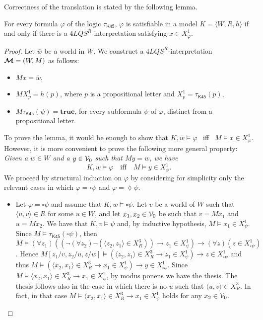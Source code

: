 \documentclass{fundam}
\newcommand{\true}{\mathbf{true}}
\newcommand{\model}{\ensuremath{\mbox{\boldmath $\mathcal{M}$}}\xspace}
\newcommand{\Kr}{\mathit{K}}
\newcommand{\Kqc}{\mathsf{K45}}
\newcommand{\TKqc}{\tau_{\Kqc}}
\newcommand{\QLQSR}{\ensuremath{\mbox{$4\mathit{LQS}^{R}$}}\xspace}
\begin{document}
Correctness of the translation is stated by the following lemma.
\begin{lemma}\label{leK45}
For every formula $\varphi$ of the logic $\TKqc$, $\varphi$ is
satisfiable in a model $\Kr = \langle W,R,h\rangle$ if and only if
there is a
$\QLQSR$-interpretation satisfying $x \in X_{\varphi}^1$.\end{lemma}
\begin{proof}
Let $\bar{w}$ be a world in $W$.  We construct a
$\QLQSR$-interpretation $\model=(W,M)$ as follows:
\begin{itemize}
\item $Mx = \bar{w}$,

\item $M X_{p}^{1} = h(p)$, where $p$ is a propositional letter and
$X_{p}^{1} = \TKqc(p)$,

\item $M\TKqc(\psi) = \true$, for every subformula $\psi$ of
$\varphi$,
distinct from a propositional letter.
\end{itemize}
To prove the lemma, it would be enough to show that $\Kr,\bar{w}
\models \varphi$ ~iff~ $M \models x \in X_{\varphi}^{1}$.  However, it
is more convenient to prove the following more general property:\\
\indent \emph{Given a $w \in W$ and a $y \in {\cal V}_0$ such that $My =
w$, we have
$$
\Kr,w \models \varphi \mbox{ ~~iff~~ } M \models y \in
X_{\varphi}^1.
$$}
We proceed by structural induction on $\varphi$ by considering for
simplicity only the relevant cases in which $\varphi = \square \psi$
and $\varphi = \lozenge \psi$.
\begin{itemize}
\item Let $\varphi = \square \psi$ and assume that $\Kr,w \models
\square \psi$.  Let $v$ be a world of $W$ such that $\langle
u,v\rangle \in R$ for some $u\in W$, and let $x_1,x_2 \in {\cal V}_0$
be such that $v = Mx_1$ and $u = Mx_2$.  We have that $\Kr,v \models
\psi$ and, by inductive hypothesis, $M \models x_1 \in X_{\psi}^{1}$.
Since $M \models \TKqc(\square \psi)$, then $M \models (\forall
z_1)((\neg(\forall z_2)\neg (\langle z_2,z_1\rangle\in X_R^{3}))
\rightarrow z_1 \in X_{\psi}^{1}) \rightarrow (\forall z)(z \in
X_{\square \psi}^{1})$.  Hence $M[z_1/v,z_2/u,z/w]\models (\langle
z_2,z_1\rangle\in X_R^{3} \rightarrow z_1 \in X_{\psi}^{1})
\rightarrow z \in X_{\square \psi}^{1}$ and thus $M \models (\langle
x_2,x_1\rangle\in X_R^{3} \rightarrow x_1 \in X_{\psi}^{1})
\rightarrow y \in X_{\square \psi}^{1}$.  Since $M \models \langle
x_2,x_1\rangle\in X_R^{3} \rightarrow x_1 \in X_{\psi}^{1}$, by modus
ponens we have the thesis.  The thesis follows also in the case in
which there is no $u$ such that $\langle u,v\rangle\in X_R^{3}$.  In
fact, in that case $M \models \langle x_2,x_1\rangle\in X_R^{3}
\rightarrow x_1 \in X_{\psi}^{1}$ holds for any $x_2 \in {\cal V}_0$.


\end{itemize}
\end{proof}
\end{document}
